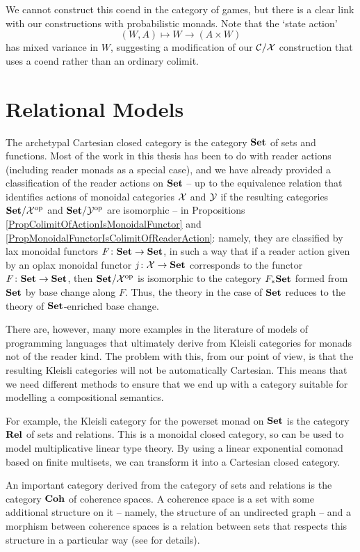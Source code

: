 \documentclass[11pt]{report}
\begin{document}
We cannot construct this coend in the category of games, but there is a clear link with our constructions with probabilistic monads.  
Note that the `state action'
\[
  (W, A) \mapsto W \to (A \times W)
  \]
has mixed variance in $W$, suggesting a modification of our ${\mathcal{C}}/\mathcal X$ construction that uses a coend rather than an ordinary colimit.

\section{Relational Models}

The archetypal Cartesian closed category is the category ${\normalfont\textbf{Set}}$ of sets and functions.  
Most of the work in this thesis has been to do with reader actions (including reader monads as a special case), and we have already provided a classification of the reader actions on ${\normalfont\textbf{Set}}$ -- up to the equivalence relation that identifies actions of monoidal categories $\mathcal X$ and $\mathcal Y$ if the resulting categories ${\normalfont\textbf{Set}}/\mathcal X^{\mathrm{op}}$ and ${\normalfont\textbf{Set}}/\mathcal Y^{\mathrm{op}}$ are isomorphic -- in Propositions \ref{PropColimitOfActionIsMonoidalFunctor} and \ref{PropMonoidalFunctorIsColimitOfReaderAction}: namely, they are classified by lax monoidal functors $F\colon{\normalfont\textbf{Set}} \to {\normalfont\textbf{Set}}$, in such a way that if a reader action given by an oplax monoidal functor $j\colon\mathcal X \to {\normalfont\textbf{Set}}$ corresponds to the functor $F \colon {\normalfont\textbf{Set}} \to {\normalfont\textbf{Set}}$, then ${\normalfont\textbf{Set}}/\mathcal X^{\mathrm{op}}$ is isomorphic to the category $F_*{\normalfont\textbf{Set}}$ formed from ${\normalfont\textbf{Set}}$ by base change along $F$.
Thus, the theory in the case of ${\normalfont\textbf{Set}}$ reduces to the theory of ${\normalfont\textbf{Set}}$-enriched base change.

There are, however, many more examples in the literature of models of programming languages that ultimately derive from Kleisli categories for monads not of the reader kind.  
The problem with this, from our point of view, is that the resulting Kleisli categories will not be automatically Cartesian.  
This means that we need different methods to ensure that we end up with a category suitable for modelling a compositional semantics.

For example, the Kleisli category for the powerset monad on ${\normalfont\textbf{Set}}$ is the category ${\normalfont\textbf{Rel}}$ of sets and relations.  
This is a monoidal closed category, so can be used to model multiplicative linear type theory.
By using a linear exponential comonad based on finite multisets, we can transform it into a Cartesian closed category.

An important category derived from the category of sets and relations is the category ${\normalfont\textbf{Coh}}$ of coherence spaces.  
A coherence space is a set with some additional structure on it -- namely, the structure of an undirected graph -- and a morphism between coherence spaces is a relation between sets that respects this structure in a particular way (see \cite{MelliesCoherence} for details).  
\end{document}
